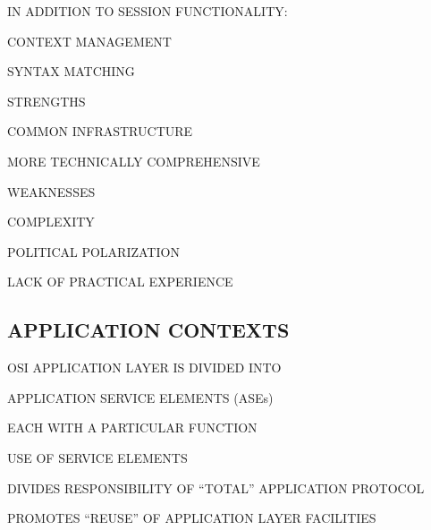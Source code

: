 \begin{bwslide}

\begin{nrtc}
\item	IN ADDITION TO SESSION FUNCTIONALITY:
    \begin{nrtc}
    \item	CONTEXT MANAGEMENT

    \item	SYNTAX MATCHING
    \end{nrtc}
\end{nrtc}
\end{bwslide}


\begin{bwslide}

\begin{nrtc}
\item	STRENGTHS
    \begin{nrtc}
    \item	COMMON INFRASTRUCTURE

    \item	MORE TECHNICALLY COMPREHENSIVE
    \end{nrtc}

\item	WEAKNESSES
    \begin{nrtc}
    \item	COMPLEXITY

    \item	POLITICAL POLARIZATION

    \item	LACK OF PRACTICAL EXPERIENCE
    \end{nrtc}
\end{nrtc}
\end{bwslide}


\begin{bwslide}
\part*	{APPLICATION CONTEXTS}\bf

\begin{nrtc}
\item	OSI APPLICATION LAYER IS DIVIDED INTO
    \begin{nrtc}
    \item	APPLICATION SERVICE ELEMENTS (ASEs)
    \end{nrtc}
	EACH WITH A PARTICULAR FUNCTION

\item	USE OF SERVICE ELEMENTS
    \begin{nrtc}
    \item	DIVIDES RESPONSIBILITY OF ``TOTAL'' APPLICATION PROTOCOL

    \item	PROMOTES ``REUSE'' OF APPLICATION LAYER FACILITIES
    \end{nrtc}
\end{nrtc}
\end{bwslide}


